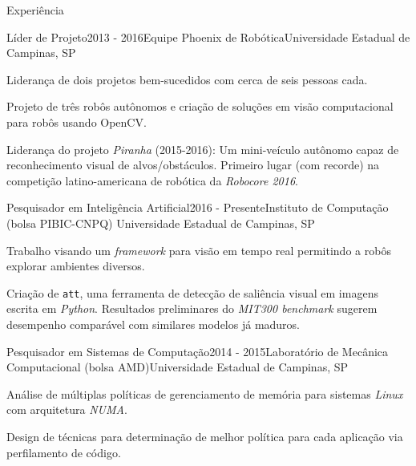 \documentclass[8pt]{resume}
\newcommand{\tit}[1]{\textit{#1}}
\newcommand{\ttt}[1]{\texttt{#1}}
\begin{document}
\begin{rSection}{Experiência}

\begin{rSubsection}{Líder de Projeto}{2013 - 2016}{Equipe Phoenix de Robótica}{Universidade Estadual de Campinas, SP}
    \item Liderança de dois projetos bem-sucedidos com cerca de seis pessoas
        cada.
    \item Projeto de três robôs autônomos e
        criação de soluções em visão computacional para robôs usando OpenCV.
    \item Liderança do projeto \tit{Piranha} (2015-2016):
        Um mini-veículo autônomo capaz de reconhecimento visual de
        alvos/obstáculos. Primeiro lugar (com recorde) na competição
        latino-americana de robótica da \tit{Robocore 2016}.
\end{rSubsection}

\begin{rSubsection}{Pesquisador em Inteligência Artificial}{2016 - Presente}{Instituto de Computação (bolsa PIBIC-CNPQ)}
    {Universidade Estadual de Campinas, SP}
    \item Trabalho visando um \tit{framework} para visão em tempo real
        permitindo a robôs explorar ambientes diversos.
    \item Criação de \ttt{att}, uma ferramenta de detecção de saliência
        visual em imagens escrita em \tit{Python}.
        Resultados preliminares do \tit{MIT300 benchmark} sugerem
        desempenho comparável com similares modelos já maduros.
\end{rSubsection}

\begin{rSubsection}{Pesquisador em Sistemas de Computação}{2014 - 2015}{Laboratório de Mecânica Computacional (bolsa AMD)}{Universidade Estadual de Campinas, SP}
    \item Análise de múltiplas políticas de gerenciamento de memória para
        sistemas \tit{Linux} com arquitetura \tit{NUMA}.
    \item Design de técnicas para determinação de melhor política para
        cada aplicação via perfilamento de código.
\end{rSubsection}


\end{rSection}
\end{document}
